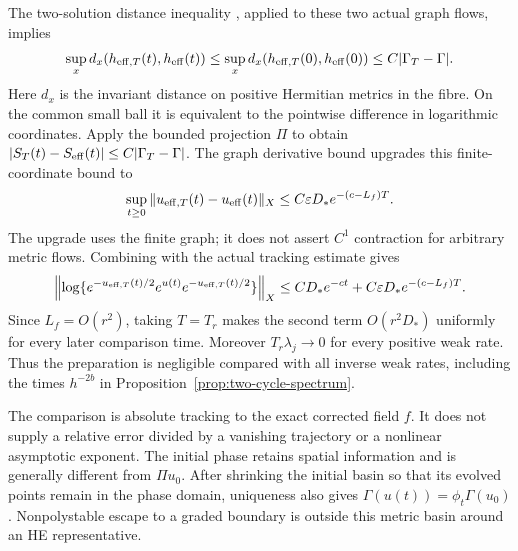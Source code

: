The two-solution distance inequality
\cite[Lemma 6.4.5]{Kobayashi}, applied to these two actual
graph flows, implies
\[
 \sup_x d_x(h_{{\rm eff},T}(t),h_{\rm eff}(t))
          \le\sup_x d_x(h_{{\rm eff},T}(0),h_{\rm eff}(0))
          \le C|\Gamma_T-\Gamma|.
\]
Here $d_x$ is the invariant distance on positive Hermitian
metrics in the fibre. On the common small ball it is
equivalent to the pointwise difference in logarithmic
coordinates. Apply the bounded projection $\Pi$ to
obtain $|S_T(t)-S_{\rm eff}(t)|\le C|\Gamma_T-\Gamma|$.
The graph derivative bound upgrades this finite-coordinate
bound to
\begin{equation}\label{eq:prepared-trajectory-error}
 \sup_{t\ge0}\|u_{{\rm eff},T}(t)-u_{\rm eff}(t)\|_X
                      \le C\varepsilon D_*e^{-(c-L_f)T}.
\end{equation}
The upgrade uses the finite graph; it does not assert
$C^1$ contraction for arbitrary metric flows.
Combining with the actual tracking estimate gives
\[
 \left\|\log\{e^{-u_{{\rm eff},T}(t)/2}e^{u(t)}
                           e^{-u_{{\rm eff},T}(t)/2}\}\right\|_X
       \le CD_*e^{-ct}+C\varepsilon D_*e^{-(c-L_f)T}.
\]
Since $L_f=O(r^2)$, taking $T=T_r$ makes the second
term $O(r^2D_*)$ uniformly for every later comparison time.
Moreover $T_r\lambda_j\to0$ for every positive weak rate.
Thus the preparation is negligible compared with all
inverse weak rates, including the times $h^{-2b}$ in
Proposition~\ref{prop:two-cycle-spectrum}.

The comparison is absolute tracking to the exact corrected
field $f$. It does not supply a relative error divided by
a vanishing trajectory or a nonlinear asymptotic exponent.
The initial phase retains spatial information and is
generally different from $\Pi u_0$. After shrinking the
initial basin so that its evolved points remain in the
phase domain, uniqueness also gives
$\Gamma(u(t))=\phi_t\Gamma(u_0)$.
Nonpolystable escape to a graded boundary is outside this
metric basin around an HE representative.
